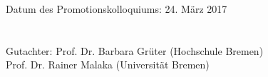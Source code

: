 

\begin{singlespace}
	\vspace*{160mm} Datum des Promotionskolloquiums: 24. März 2017\\
	\\
	\\
	Gutachter: Prof. Dr. Barbara Grüter (Hochschule Bremen)\\
	Prof. Dr. Rainer Malaka (Universität Bremen)\\
\end{singlespace}
